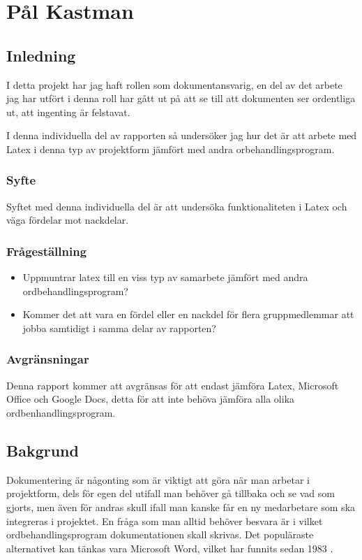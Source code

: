 \section{Pål Kastman}
\subsection{Inledning}
I detta projekt har jag haft rollen som dokumentansvarig, en del av det arbete jag har utfört i denna roll har gått ut på att se till att dokumenten ser ordentliga ut, att ingenting är felstavat.

I denna individuella del av rapporten så undersöker jag hur det är att arbete med Latex i denna typ av projektform jämfört med andra orbehandlingsprogram.

\subsubsection{Syfte}
Syftet med denna individuella del är att undersöka funktionaliteten i Latex och väga fördelar mot nackdelar.

\subsubsection{Frågeställning}
\begin{itemize}
\item Uppmuntrar latex till en viss typ av samarbete jämfört med andra ordbehandlingsprogram?
\item Kommer det att vara en fördel eller en nackdel för flera gruppmedlemmar att jobba samtidigt i samma delar av rapporten?
\end{itemize}

\subsubsection{Avgränsningar}
Denna rapport kommer att avgränsas för att endast jämföra Latex, Microsoft Office och Google Docs, detta för att inte behöva jämföra alla olika ordbenhandlingsprogram.

\subsection{Bakgrund}
Dokumentering är någonting som är viktigt att göra när man arbetar i projektform, dels för egen del utifall man behöver gå tillbaka och se vad som gjorts, men även för andras skull ifall man kanske får en ny medarbetare som ska integreras i 
projektet. En fråga som man alltid behöver besvara är i vilket ordbehandlingsprogram dokumentationen skall skrivas. Det populäraste alternativet kan tänkas vara Microsoft Word, vilket har funnits sedan 1983 \cite{word_ursprung}.

